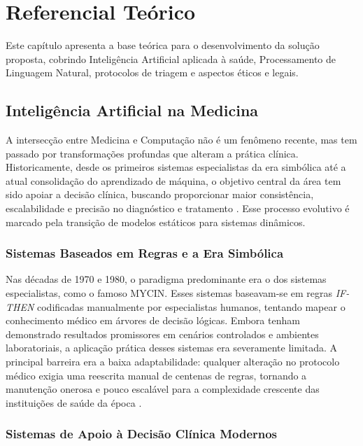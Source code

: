 \chapter{Referencial Teórico}
\label{cap:referencial}

Este capítulo apresenta a base teórica para o desenvolvimento da solução proposta, cobrindo
Inteligência Artificial aplicada à saúde, Processamento de Linguagem Natural, protocolos de
triagem e aspectos éticos e legais.

\section{Inteligência Artificial na Medicina}

A intersecção entre Medicina e Computação não é um fenômeno recente, mas tem passado por 
transformações profundas que alteram a prática clínica. Historicamente, desde os primeiros 
sistemas especialistas da era simbólica até a atual consolidação do aprendizado de máquina, 
o objetivo central da área tem sido apoiar a decisão clínica, buscando proporcionar maior 
consistência, escalabilidade e precisão no diagnóstico e tratamento \cite{richens2020,
shortliffe1975}. Esse processo evolutivo é marcado pela transição de modelos estáticos para
sistemas dinâmicos.

\subsection{Sistemas Baseados em Regras e a Era Simbólica}

Nas décadas de 1970 e 1980, o paradigma predominante era o dos sistemas especialistas, como 
o famoso MYCIN. Esses sistemas baseavam-se em regras \textit{IF-THEN} codificadas manualmente 
por especialistas humanos, tentando mapear o conhecimento médico em árvores de decisão lógicas. 
Embora tenham demonstrado resultados promissores em cenários controlados e ambientes 
laboratoriais, a aplicação prática desses sistemas era severamente limitada. A principal 
barreira era a baixa adaptabilidade: qualquer alteração no protocolo médico exigia uma reescrita 
manual de centenas de regras, tornando a manutenção onerosa e pouco escalável para a complexidade 
crescente das instituições de saúde da época \cite{shortliffe1975}.

\subsection{Sistemas de Apoio à Decisão Clínica Modernos}

